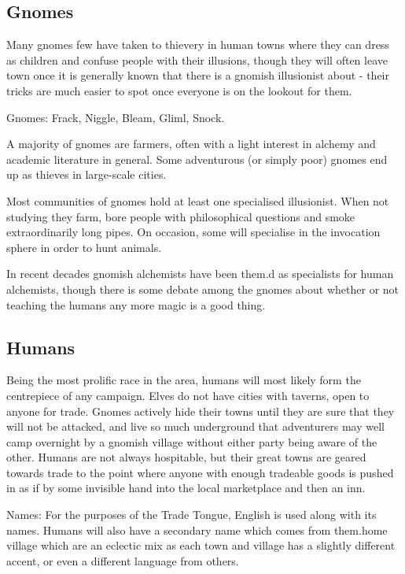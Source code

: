 \subsection{Gnomes}

Many gnomes few have taken to thievery in human towns where they can dress as children and confuse people with their illusions, though they will often leave town once it is generally known that there is a gnomish illusionist about - their tricks are much easier to spot once everyone is on the lookout for them.

	Gnomes: Frack, Niggle, Bleam, Gliml, Snock.

\label{gnomish_citizen}
\gnome

A majority of gnomes are farmers, often with a light interest in alchemy and academic literature in general.  Some adventurous (or simply poor) gnomes end up as thieves in large-scale cities.

\label{gnomish_illusionist}

Most communities of gnomes hold at least one specialised illusionist.  When not studying they farm, bore people with philosophical questions and smoke extraordinarily long pipes.  On occasion, some will specialise in the invocation sphere in order to hunt animals.

	In recent decades gnomish alchemists have been them.d as specialists for human alchemists, though there is some debate among the gnomes about whether or not teaching the humans any more magic is a good thing.

\subsection{Humans}

Being the most prolific race in the area, humans will most likely form the centrepiece of any campaign.  Elves do not have cities with taverns, open to anyone for trade.  Gnomes actively hide their towns until they are sure that they will not be attacked, and live so much underground that adventurers may well camp overnight by a gnomish village without either party being aware of the other.  Humans are not always hospitable, but their great towns are geared towards trade to the point where anyone with enough tradeable goods is pushed in as if by some invisible hand into the local marketplace and then an inn.

	Names: For the purposes of the Trade Tongue, English is used along with its names.  Humans will also have a secondary name which comes from them.home village which are an eclectic mix as each town and village has a slightly different accent, or even a different language from others.

